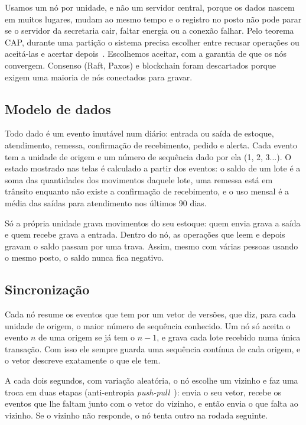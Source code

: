 \documentclass[a4paper,12pt]{article}
\begin{document}
Usamos um nó por unidade, e não um servidor central, porque os dados nascem em muitos
lugares, mudam ao mesmo tempo e o registro no posto não pode parar se o servidor da
secretaria cair, faltar energia ou a conexão falhar. Pelo teorema CAP, durante uma
partição o sistema precisa escolher entre recusar operações ou aceitá-las e acertar
depois~\cite{gilbert2002}. Escolhemos aceitar, com a garantia de que os nós convergem.
Consenso (Raft, Paxos) e blockchain foram descartados porque exigem uma maioria de nós
conectados para gravar.

\subsection{Modelo de dados}

Todo dado é um evento imutável num diário: entrada ou saída de estoque, atendimento,
remessa, confirmação de recebimento, pedido e alerta. Cada evento tem a unidade de origem
e um número de sequência dado por ela (1, 2, 3...). O estado mostrado nas telas é
calculado a partir dos eventos: o saldo de um lote é a soma das quantidades dos movimentos
daquele lote, uma remessa está em trânsito enquanto não existe a confirmação de
recebimento, e o uso mensal é a média das saídas para atendimento nos últimos 90 dias.

Só a própria unidade grava movimentos do seu estoque: quem envia grava a saída e quem
recebe grava a entrada. Dentro do nó, as operações que leem e depois gravam o saldo passam
por uma trava. Assim, mesmo com várias pessoas usando o mesmo posto, o saldo nunca fica
negativo.

\subsection{Sincronização}

Cada nó resume os eventos que tem por um vetor de versões, que diz, para cada unidade de
origem, o maior número de sequência conhecido. Um nó só aceita o evento $n$ de uma origem
se já tem o $n-1$, e grava cada lote recebido numa única transação. Com isso ele sempre
guarda uma sequência contínua de cada origem, e o vetor descreve exatamente o que ele tem.

A cada dois segundos, com variação aleatória, o nó escolhe um vizinho e faz uma troca em
duas etapas (anti-entropia \emph{push-pull}~\cite{demers1987}): envia o seu vetor, recebe
os eventos que lhe faltam junto com o vetor do vizinho, e então envia o que falta ao
vizinho. Se o vizinho não responde, o nó tenta outro na rodada seguinte.
\end{document}
